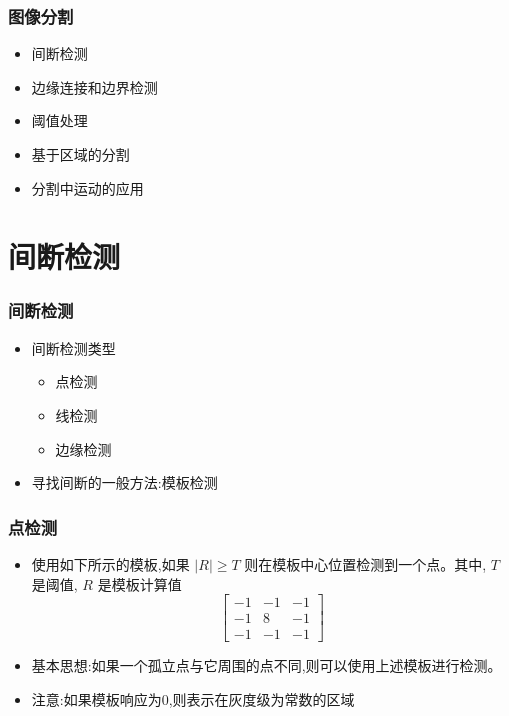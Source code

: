 \documentclass{beamer}
\begin{document}
\begin{frame}
\frametitle{图像分割}
\label{sec-1-3}

\begin{itemize}
\item 间断检测
\item 边缘连接和边界检测
\item 阈值处理
\item 基于区域的分割
\item 分割中运动的应用
\end{itemize}
\end{frame}
\section{间断检测}
\label{sec-2}
\begin{frame}
\frametitle{间断检测}
\label{sec-2-1}

\begin{itemize}
\item 间断检测类型
\begin{itemize}
\item 点检测
\item 线检测
\item 边缘检测
\end{itemize}
\item 寻找间断的一般方法:模板检测
\end{itemize}
\end{frame}
\begin{frame}
\frametitle{点检测}
\label{sec-2-2}

\begin{itemize}
\item 使用如下所示的模板,如果 $|R|\geq T$ 则在模板中心位置检测到一个点。其中, $T$ 是阈值, $R$ 是模板计算值
       \[\begin{bmatrix}
           -1 & -1 & -1 \\
           -1 &  8 & -1 \\
           -1 & -1 & -1 \end{bmatrix}\]
\item 基本思想:如果一个孤立点与它周围的点不同,则可以使用上述模板进行检测。
\item 注意:如果模板响应为0,则表示在灰度级为常数的区域
\end{itemize}
\end{frame}
\end{document}
